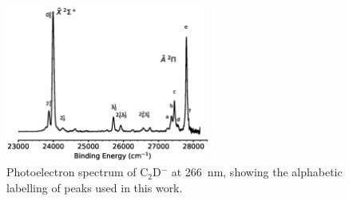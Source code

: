 \documentclass[journal=jacsat,manuscript=suppinfo]{achemso}
\begin{document}
\begin{figure}[th!]
	\includegraphics[width=0.6\textwidth]{figures/FigS2}
	\caption{Photoelectron spectrum of C$_2$D$^-$ at 266~nm, showing the alphabetic labelling of peaks used in this work.}
	\label{fig:2}
\end{figure}
\end{document}
